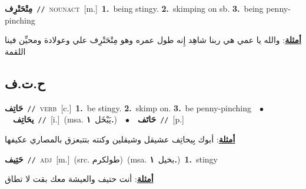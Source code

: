 \documentclass[10pt,a4paper,twoside]{article} %
\begin{document}
\begin{multicols}{2}
{{{{{{{{{\setlength\topsep{0pt}\textbf{\foreignlanguage{arabic}{مِتْحَتْرِف}}\ {\color{gray}\texttt{//}\color{black}}\ \textsc{noun\textunderscore act}\ [m.]\ \textbf{1.}~being stingy.  \textbf{2.}~skimping on sb.  \textbf{3.}~being penny-pinching\  \begin{flushright}\color{gray}\foreignlanguage{arabic}{\textbf{\underline{\foreignlanguage{arabic}{أمثلة}}}: والله يا عمي هي ربنا شاهِد إِنه طول عمره وهو مِتْحَتْرِف علي وعولادة ومحيِّن فينا اللقمة}\end{flushright}\color{black}} \vspace{2mm}

\vspace{-3mm}
\subsection*{\color{blue}\foreignlanguage{arabic}{ح.ت.ف}\color{blue}{}} 

{\setlength\topsep{0pt}\textbf{\foreignlanguage{arabic}{حَاتِف}}\ {\color{gray}\texttt{//}\color{black}}\ \textsc{verb}\ [c.]\ \textbf{1.}~be stingy.  \textbf{2.}~skimp on.  \textbf{3.}~be penny-pinching\ \ $\bullet$\ \ \setlength\topsep{0pt}\textbf{\foreignlanguage{arabic}{يحَاتِف}}\ {\color{gray}\texttt{//}\color{black}}\ [i.]\ \color{gray}(msa. \foreignlanguage{arabic}{يَبْخَل}~\foreignlanguage{arabic}{\textbf{١.}})\color{black}\ \ $\bullet$\ \ \setlength\topsep{0pt}\textbf{\foreignlanguage{arabic}{حَاتَف}}\ {\color{gray}\texttt{//}\color{black}}\ [p.]\  \begin{flushright}\color{gray}\foreignlanguage{arabic}{\textbf{\underline{\foreignlanguage{arabic}{أمثلة}}}: أبوك بِيحاتِف عشيقل وشيقلين وكنته بتتبعزق بالمصاري عكيفها}\end{flushright}\color{black}} \vspace{2mm}

{\setlength\topsep{0pt}\textbf{\foreignlanguage{arabic}{حَتِيف}}\ {\color{gray}\texttt{//}\color{black}}\ \textsc{adj}\ [m.]\ (src. \color{gray}\foreignlanguage{arabic}{طولكرم}\color{black})\ \color{gray}(msa. \foreignlanguage{arabic}{بخيل}~\foreignlanguage{arabic}{\textbf{١.}})\color{black}\ \textbf{1.}~stingy\  \begin{flushright}\color{gray}\foreignlanguage{arabic}{\textbf{\underline{\foreignlanguage{arabic}{أمثلة}}}: أنت حتيف والعيشة معك بقت لا تطاق}\end{flushright}\color{black}} \vspace{2mm}

}}}}}}}}
\end{multicols}
\end{document}
